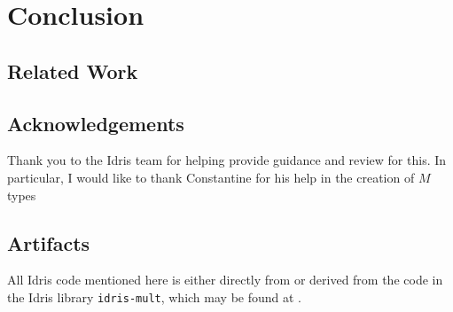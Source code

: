 \section{Conclusion}

\subsection*{Related Work}

\subsection*{Acknowledgements}

Thank you to the Idris team for helping provide guidance and review for this.
In particular, I would like to thank Constantine for his help in the creation of $M$ types

\subsection*{Artifacts}

All Idris code mentioned here is either directly from or derived from the code in the Idris library \verb|idris-mult|, which may be found at .
